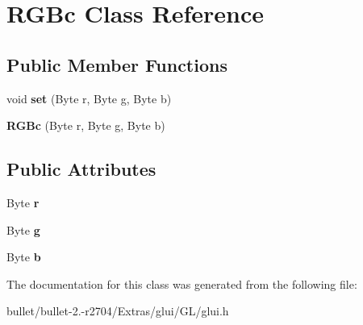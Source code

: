 \hypertarget{class_r_g_bc}{\section{R\+G\+Bc Class Reference}
\label{class_r_g_bc}
}
\subsection*{Public Member Functions}
\begin{DoxyCompactItemize}
\item 
\hypertarget{class_r_g_bc_a60b887d5881c06dcb2ba0d2e75e01855}{void {\bfseries set} (Byte r, Byte g, Byte b)}\label{class_r_g_bc_a60b887d5881c06dcb2ba0d2e75e01855}

\item 
\hypertarget{class_r_g_bc_aaa6e6a4e21d3112836924657ea40cb84}{{\bfseries R\+G\+Bc} (Byte r, Byte g, Byte b)}\label{class_r_g_bc_aaa6e6a4e21d3112836924657ea40cb84}

\end{DoxyCompactItemize}
\subsection*{Public Attributes}
\begin{DoxyCompactItemize}
\item 
\hypertarget{class_r_g_bc_a924706b7ae3839bd89d84a41a38ac86a}{Byte {\bfseries r}}\label{class_r_g_bc_a924706b7ae3839bd89d84a41a38ac86a}

\item 
\hypertarget{class_r_g_bc_a0b4fc208f3eb1d14adbd67a0d7c72843}{Byte {\bfseries g}}\label{class_r_g_bc_a0b4fc208f3eb1d14adbd67a0d7c72843}

\item 
\hypertarget{class_r_g_bc_a587697e813f12fadbaafea78450dce93}{Byte {\bfseries b}}\label{class_r_g_bc_a587697e813f12fadbaafea78450dce93}

\end{DoxyCompactItemize}


The documentation for this class was generated from the following file\+:\begin{DoxyCompactItemize}
\item 
bullet/bullet-\/2.-\/r2704/\+Extras/glui/\+G\+L/glui.\+h\end{DoxyCompactItemize}

